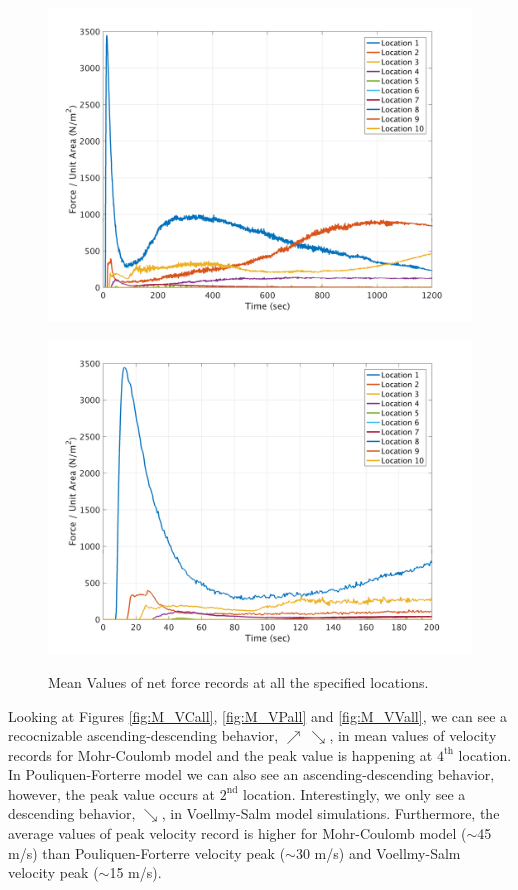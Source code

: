 \documentclass[a4paper,10pt]{article}
\begin{document}
\begin{figure}[H]
	\begin{minipage}[b]{0.5\linewidth}
	\centering
    \includegraphics[width=1\textwidth]{MeansAll/FnetV.png}
        \label{fig:M_FnV}
	\end{minipage}
	\begin{minipage}[b]{0.5\linewidth}
	\centering
    \includegraphics[width=1\textwidth]{MeansAll/FnetV_0-200.png}
        \label{fig:M_FnVz}
	\end{minipage}

	\caption{Mean Values of net force records at all the specified locations.}\label{fig:M_Fnet}
\end{figure}
\newpage
Looking at Figures \ref{fig:M_VCall}, \ref{fig:M_VPall} and \ref{fig:M_VVall}, we can see a recocnizable ascending-descending behavior, $\nearrow \ \searrow$, in mean values of velocity records for Mohr-Coulomb model and the peak value is happening at $4^{\mathrm{th}}$ location. In Pouliquen-Forterre model we can also see an ascending-descending behavior, however, the peak value occurs at $2^{\mathrm{nd}}$ location. Interestingly, we only see a descending behavior, $\searrow$, in Voellmy-Salm model simulations. Furthermore, the average values of peak velocity record is higher for Mohr-Coulomb model ($\sim$45 m/s) than Pouliquen-Forterre velocity peak ($\sim$30 m/s) and Voellmy-Salm velocity peak ($\sim$15 m/s).
\end{document}
